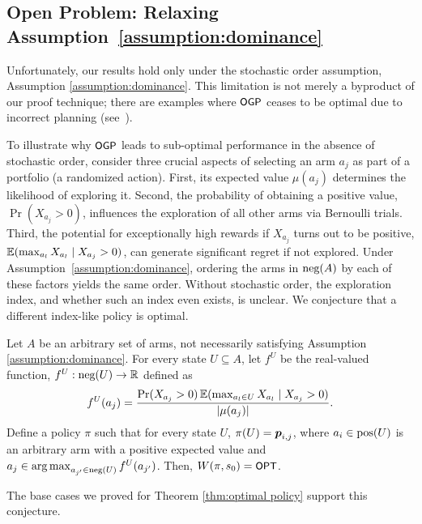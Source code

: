 \subsection{Open Problem: Relaxing Assumption~\ref{assumption:dominance}}\label{subsec:conjecture}
Unfortunately, our results hold only under the stochastic order assumption, Assumption \ref{assumption:dominance}. This limitation is not merely a byproduct of our proof technique; there are examples where ${\small\textnormal{\textsf{OGP}}}$ ceases to be optimal due to incorrect planning (see~{\ifnum{}\fi}).

To illustrate why ${\small\textnormal{\textsf{OGP}}}$ leads to sub-optimal performance in the absence of stochastic order, consider three crucial aspects of selecting an arm $a_j$ as part of a portfolio (a randomized action). First, its expected value $\mu(a_j)$ determines the likelihood of exploring it. Second, the probability of obtaining a positive value, $\Pr(X_{a_j}>0)$,  influences the exploration of all other arms via Bernoulli trials. Third, the potential for exceptionally high rewards if $X_{a_j}$ turns out to be positive, $\operatorname{\mathbb{E}}(\max_{a_l } X_{a_l}\mid X_{a_j}>0 )$, can generate significant regret if not explored. Under Assumption~\ref{assumption:dominance}, ordering the arms in $\textnormal{neg}(A)$ by each of these factors yields the same order. Without stochastic order, the exploration index, and whether such an index even exists, is unclear. We conjecture that a different index-like policy is optimal.

\begin{conjecture}
Let $A$ be an arbitrary set of arms, not necessarily satisfying Assumption \ref{assumption:dominance}. For every state $U\subseteq A$, let $f^U$ be the real-valued function, $f^U:\textnormal{neg}(U)\rightarrow \mathbb R$ defined as
\[
f^U(a_{j})=\frac{\Pr(X_{a_j} > 0 )\operatorname{\mathbb{E}}(\max_{a_l \in {U} } X_{a_l}\mid X_{a_j}>0 )}{\left| \mu(a_j) \right|}.
\] 
Define a policy $\pi$ such that for every state $U$, $\pi(U)=\boldsymbol{ p }_{i,j}$, where $a_i \in \textnormal{pos}(U)$ is an arbitrary arm with a positive expected value and $a_j  \in \operatorname*{arg\,max}_{a_{j'}\in \textnormal{neg}(U)} f^U(a_{j'})$. Then, $W(\pi,s_0)={\small\textnormal{\textsf{OPT}}}$. 
\end{conjecture}
The base cases we proved for Theorem \ref{thm:optimal policy} support this conjecture. 


%





